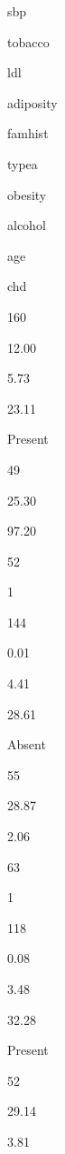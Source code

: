 \documentclass[10pt,ignorenonframetext,]{beamer}
\newenvironment{Shaded}{\begin{snugshade}}{\end{snugshade}}
\newcommand{\KeywordTok}[1]{\textcolor[rgb]{0.13,0.29,0.53}{\textbf{#1}}}
\newcommand{\DataTypeTok}[1]{\textcolor[rgb]{0.13,0.29,0.53}{#1}}
\newcommand{\StringTok}[1]{\textcolor[rgb]{0.31,0.60,0.02}{#1}}
\newcommand{\OperatorTok}[1]{\textcolor[rgb]{0.81,0.36,0.00}{\textbf{#1}}}
\newcommand{\NormalTok}[1]{#1}
\begin{document}
\begin{frame}[fragile]

\footnotesize

\begin{Shaded}
\end{Shaded}

sbp

tobacco

ldl

adiposity

famhist

typea

obesity

alcohol

age

chd

160

12.00

5.73

23.11

Present

49

25.30

97.20

52

1

144

0.01

4.41

28.61

Absent

55

28.87

2.06

63

1

118

0.08

3.48

32.28

Present

52

29.14

3.81


\end{frame}
\end{document}
